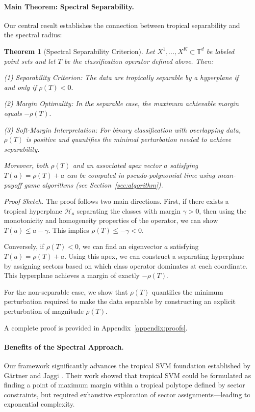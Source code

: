 \documentclass{article}
\newtheorem{theorem}{Theorem}
\newcommand{\trop}{\mathbb{T}}
\begin{document}
\paragraph{Main Theorem: Spectral Separability.}
Our central result establishes the connection between tropical separability and the spectral radius:

\begin{theorem}[Spectral Separability Criterion]\label{thm:spectral_separability}
Let $X^1,\ldots,X^K \subset \trop^d$ be labeled point sets and let $T$ be the classification operator defined above. Then:

(1) \textit{Separability Criterion:} The data are tropically separable by a hyperplane if and only if $\rho(T) < 0$.

(2) \textit{Margin Optimality:} In the separable case, the maximum achievable margin equals $-\rho(T)$.

(3) \textit{Soft-Margin Interpretation:} For binary classification with overlapping data, $\rho(T)$ is positive and quantifies the minimal perturbation needed to achieve separability.

Moreover, both $\rho(T)$ and an associated apex vector $a$ satisfying $T(a) = \rho(T)+a$ can be computed in pseudo-polynomial time using mean-payoff game algorithms (see Section~\ref{sec:algorithm}).
\end{theorem}

\emph{Proof Sketch.}
The proof follows two main directions. First, if there exists a tropical hyperplane $\mathcal{H}_a$ separating the classes with margin $\gamma>0$, then using the monotonicity and homogeneity properties of the operator, we can show $T(a) \leq a - \gamma$. This implies $\rho(T) \leq -\gamma < 0$.

Conversely, if $\rho(T)<0$, we can find an eigenvector $a$ satisfying $T(a)=\rho(T)+a$. Using this apex, we can construct a separating hyperplane by assigning sectors based on which class operator dominates at each coordinate. This hyperplane achieves a margin of exactly $-\rho(T)$.

For the non-separable case, we show that $\rho(T)$ quantifies the minimum perturbation required to make the data separable by constructing an explicit perturbation of magnitude $\rho(T)$.

A complete proof is provided in Appendix~\ref{appendix:proofs}.

\paragraph{Benefits of the Spectral Approach.} 
Our framework significantly advances the tropical SVM foundation established by Gärtner and Jaggi \cite{gartner2008}. Their work showed that tropical SVM could be formulated as finding a point of maximum margin within a tropical polytope defined by sector constraints, but required exhaustive exploration of sector assignments—leading to exponential complexity.
\end{document}
